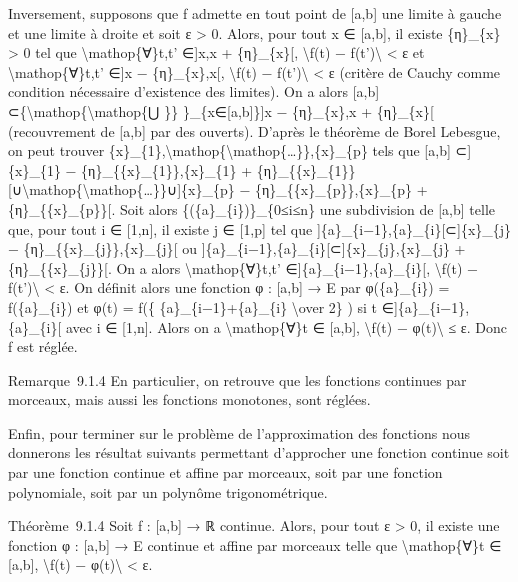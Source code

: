 \documentclass[]{article}
\begin{document}
Inversement, supposons que f admette en tout point de {[}a,b{]} une
limite à gauche et une limite à droite et soit ε \textgreater{} 0.
Alors, pour tout x ∈ {[}a,b{]}, il existe \{η\}\_\{x\} \textgreater{} 0
tel que \textbackslash{}mathop\{∀\}t,t' ∈{]}x,x + \{η\}\_\{x\}{[},
\textbackslash{}\textbar{}f(t) − f(t')\textbackslash{}\textbar{}
\textless{} ε et \textbackslash{}mathop\{∀\}t,t' ∈{]}x −
\{η\}\_\{x\},x{[}, \textbackslash{}\textbar{}f(t) −
f(t')\textbackslash{}\textbar{} \textless{} ε (critère de Cauchy comme
condition nécessaire d'existence des limites). On a alors {[}a,b{]}
⊂\{\textbackslash{}mathop\{\textbackslash{}mathop\{⋃ \}\}
\}\_\{x∈{[}a,b{]}\}{]}x − \{η\}\_\{x\},x + \{η\}\_\{x\}{[} (recouvrement
de {[}a,b{]} par des ouverts). D'après le théorème de Borel Lebesgue, on
peut trouver
\{x\}\_\{1\},\textbackslash{}mathop\{\textbackslash{}mathop\{\ldots{}\}\},\{x\}\_\{p\}
tels que {[}a,b{]} ⊂{]}\{x\}\_\{1\} −
\{η\}\_\{\{x\}\_\{1\}\},\{x\}\_\{1\} +
\{η\}\_\{\{x\}\_\{1\}\}{[}∪\textbackslash{}mathop\{\textbackslash{}mathop\{\ldots{}\}\}∪{]}\{x\}\_\{p\}
− \{η\}\_\{\{x\}\_\{p\}\},\{x\}\_\{p\} + \{η\}\_\{\{x\}\_\{p\}\}{[}.
Soit alors \{(\{a\}\_\{i\})\}\_\{0≤i≤n\} une subdivision de {[}a,b{]}
telle que, pour tout i ∈ {[}1,n{]}, il existe j ∈ {[}1,p{]} tel que
{]}\{a\}\_\{i−1\},\{a\}\_\{i\}{[}⊂{]}\{x\}\_\{j\} −
\{η\}\_\{\{x\}\_\{j\}\},\{x\}\_\{j\}{[} ou
{]}\{a\}\_\{i−1\},\{a\}\_\{i\}{[}⊂{]}\{x\}\_\{j\},\{x\}\_\{j\} +
\{η\}\_\{\{x\}\_\{j\}\}{[}. On a alors \textbackslash{}mathop\{∀\}t,t'
∈{]}\{a\}\_\{i−1\},\{a\}\_\{i\}{[}, \textbackslash{}\textbar{}f(t) −
f(t')\textbackslash{}\textbar{} \textless{} ε. On définit alors une
fonction φ : {[}a,b{]} → E par φ(\{a\}\_\{i\}) = f(\{a\}\_\{i\}) et φ(t)
= f(\{ \{a\}\_\{i−1\}+\{a\}\_\{i\} \textbackslash{}over 2\} ) si t
∈{]}\{a\}\_\{i−1\},\{a\}\_\{i\}{[} avec i ∈ {[}1,n{]}. Alors on a
\textbackslash{}mathop\{∀\}t ∈ {[}a,b{]}, \textbackslash{}\textbar{}f(t)
− φ(t)\textbackslash{}\textbar{} ≤ ε. Donc f est réglée.

Remarque~9.1.4 En particulier, on retrouve que les fonctions continues
par morceaux, mais aussi les fonctions monotones, sont réglées.

Enfin, pour terminer sur le problème de l'approximation des fonctions
nous donnerons les résultat suivants permettant d'approcher une fonction
continue soit par une fonction continue et affine par morceaux, soit par
une fonction polynomiale, soit par un polynôme trigonométrique.

Théorème~9.1.4 Soit f : {[}a,b{]} → ℝ continue. Alors, pour tout ε
\textgreater{} 0, il existe une fonction φ : {[}a,b{]} → E continue et
affine par morceaux telle que \textbackslash{}mathop\{∀\}t ∈ {[}a,b{]},
\textbackslash{}\textbar{}f(t) − φ(t)\textbackslash{}\textbar{}
\textless{} ε.
\end{document}
